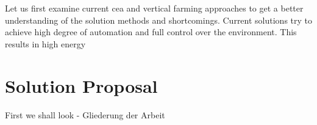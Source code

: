 Let us first examine current \ac{cea} and vertical farming approaches to get a better understanding of the solution methods and shortcomings.
Current solutions try to achieve high degree of automation and full control over the environment.
This results in high energy



\section{Solution Proposal}
First we shall look
- Gliederung der Arbeit


                                                                                                                     

